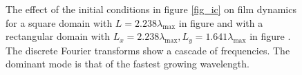 \documentclass[a4paper,12pt]{article}
\begin{document}
  \begin{figure} 
   \centering
   \caption{The effect of the initial conditions in figure \ref{fig_ic} on film dynamics for a square domain with $L=2.238\lambda_\text{max}$ in figure  and with a rectangular domain with $L_x = 2.238 \lambda_\text{max}, L_y=1.641 \lambda_\text{max}$ in figure . The discrete Fourier transforms show a cascade of frequencies. The dominant mode is that of the fastest growing wavelength.}
   \label{fig_domain_size_effect}
  \end{figure}



\end{document}
